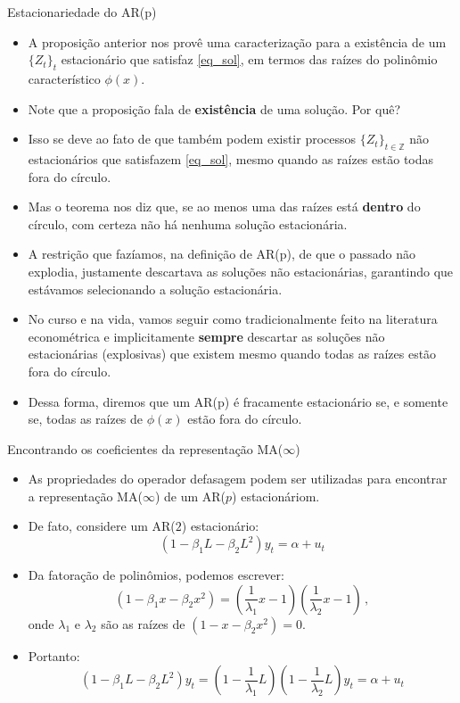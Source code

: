 \documentclass[11pt]{beamer}
\newenvironment{halfwideitemize}{\itemize\addtolength{\itemsep}{0.5em}}{\enditemize}
\begin{document}
	\begin{frame}{Estacionariedade do AR(p)}
\begin{itemize}
	\item A proposição anterior nos provê uma caracterização para a existência de um $\{Z_t\}_t$ estacionário que satisfaz \eqref{eq_sol}, em termos das {\color{blue}raízes do polinômio característico} $\phi(x)$.
	\begin{halfwideitemize}
		\item Note que a proposição fala de \textbf{existência} de {\color{red}uma} solução. Por quê?
		\item Isso se deve ao fato de que também podem existir processos $\{Z_t\}_{t \in \mathbb{Z}}$ não estacionários que satisfazem \eqref{eq_sol}, mesmo quando as raízes estão todas fora do círculo.
		\begin{halfwideitemize}
			\item Mas o teorema nos diz que, se ao menos uma das raízes está \textbf{dentro} do círculo, com certeza não há nenhuma solução estacionária.
		\end{halfwideitemize}
		\item A restrição que fazíamos, na definição de AR(p), de que o passado não explodia, justamente descartava as soluções não estacionárias, garantindo que estávamos selecionando a solução estacionária.
	\end{halfwideitemize}
			\item No curso e na vida, vamos seguir como tradicionalmente feito na literatura econométrica e implicitamente \textbf{sempre} descartar as soluções não estacionárias (explosivas) que existem mesmo quando todas as raízes estão fora do círculo.
			\begin{halfwideitemize}
				\item {\color{green}Dessa forma, diremos que um AR(p) é fracamente estacionário se, e somente se, todas as raízes de $\phi(x)$ estão fora do círculo.}
			\end{halfwideitemize}
\end{itemize}
\end{frame}
\begin{frame}{Encontrando os coeficientes da representação MA($\infty$)}
	\begin{itemize}
		\item As propriedades do operador defasagem podem ser utilizadas para encontrar a representação MA($\infty$) de um AR($p$) estacionáriom.
		\item De fato, considere um AR($2$) estacionário:
		$$(1-\beta_1 L - \beta_2 L^2)y_t = \alpha + u_t$$
		\item Da fatoração de polinômios,  podemos escrever:
		$$(1-\beta_1 x - \beta_2 x^2) = \left(\frac{1}{\lambda_1}x-1\right)\left(\frac{1}{\lambda_2}x-1\right)\, ,$$
		onde $\lambda_1$ e $\lambda_2$ são as raízes de $(1- x - \beta_2 x^2) = 0$.
		\item Portanto:
		$$(1-\beta_1 L - \beta_2 L^2)y_t =   \left(1- \frac{1}{\lambda_1}L\right) \left(1-\frac{1}{\lambda_2}L\right)y_t = \alpha + u_t$$
	\end{itemize}
\end{frame}
\end{document}
